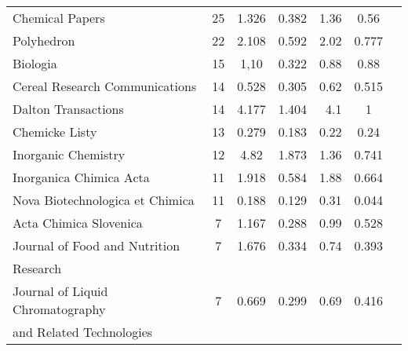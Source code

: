 \begin{longtable}[c]{lcccrcc}
  Chemical Papers                                                                    & 25     & 1.326   & 0.382 &  1.36      & 0.56                  \\[0.5ex]
  Polyhedron                                                                         & 22     & 2.108   & 0.592 &  2.02      & 0.777                 \\[0.5ex]
  Biologia                                                                           & 15     & 1,10    & 0.322 &  0.88      & 0.88                  \\[0.5ex]
  Cereal Research Communications                                                     & 14     & 0.528   & 0.305 &  0.62      & 0.515                 \\[0.5ex]
  Dalton Transactions                                                                & 14     & 4.177   & 1.404 &  4.1       & 1                     \\[0.5ex]
  Chemicke Listy                                                                     & 13     & 0.279   & 0.183 &  0.22      & 0.24                  \\[0.5ex]
  Inorganic Chemistry                                                                & 12     & 4.82    & 1.873 &  1.36      & 0.741                 \\[0.5ex]
  Inorganica Chimica Acta                                                            & 11     & 1.918   & 0.584 &  1.88      & 0.664                 \\[0.5ex]
  Nova Biotechnologica et Chimica                                                    & 11     & 0.188   & 0.129 &  0.31      & 0.044                 \\[0.5ex]
  Acta Chimica Slovenica                                                             & 7      & 1.167   & 0.288 &  0.99      & 0.528                 \\[0.5ex]
  Journal of Food and Nutrition                                                      & 7      & 1.676   & 0.334 &  0.74      & 0.393                 \\[0.5ex]
  Research                                                                           &        &         &       &            &                       \\[0.5ex]
  Journal of Liquid Chromatography                                                   & 7      & 0.669   & 0.299 &  0.69      & 0.416                 \\[0.5ex]
  and Related Technologies                                                           &        &         &       &            &                       \\[0.5ex]

\end{longtable}
